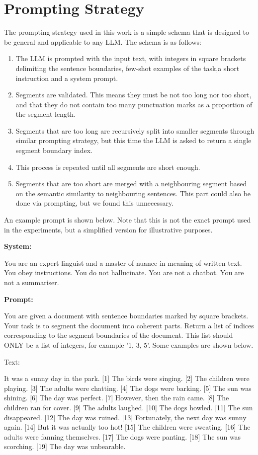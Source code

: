 \section{Prompting Strategy}\label{Prompting Strategy}

The prompting strategy used in this work is a simple schema that is designed to be general and applicable to any LLM. The schema is as follows:

\begin{enumerate}
    \item The LLM is prompted with the input text, with integers in square brackets delimiting the sentence boundaries, few-shot examples of the task,a short instruction and a system prompt.
    \item Segments are validated. This means they must be not too long nor too short, and that they do not contain too many punctuation marks as a proportion of the segment length.
    \item Segments that are too long are recursively split into smaller segments through similar prompting strategy, but this time the LLM is asked to return a single segment boundary index.
    \item This process is repeated until all segments are short enough.
    \item Segments that are too short are merged with a neighbouring segment based on the semantic similarity to neighbouring sentences. This part could also be done via prompting, but we found this unnecessary.
\end{enumerate}

An example prompt is shown below. Note that this is not the exact prompt used in the experiments, but a simplified version for illustrative purposes.

\textbf{System:}

You are an expert linguist and a master of nuance in meaning of written text. You obey instructions. You do not hallucinate. You are not a chatbot. You are not a summariser.

\textbf{Prompt:} 

You are given a document with sentence boundaries marked by square brackets. Your task is to segment the document into coherent parts. Return a list of indices corresponding to the segment boundaries of the document. This list should ONLY be a list of integers, for example '1, 3, 5'. Some examples are shown below.

Text: 

It was a sunny day in the park. [1] The birds were singing. [2] The children were playing. [3] The adults were chatting. [4] The dogs were barking. [5] The sun was shining. [6] The day was perfect. [7] However, then the rain came. [8] The children ran for cover. [9] The adults laughed. [10] The dogs howled. [11] The sun disappeared. [12] The day was ruined. [13] Fortunately, the next day was sunny again. [14] But it was actually too hot! [15] The children were sweating. [16] The adults were fanning themselves. [17] The dogs were panting. [18] The sun was scorching. [19] The day was unbearable.

